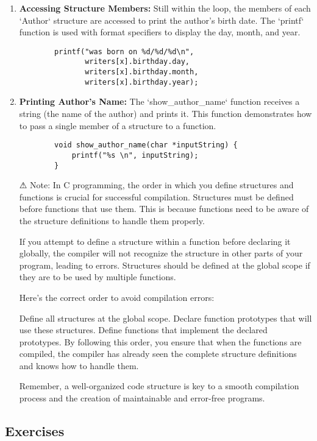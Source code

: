 \begin{enumerate}
        \item \textbf{Accessing Structure Members:} Still within the loop, the members of each `Author` structure are accessed to print the author's birth date. The `printf` function is used with format specifiers to display the day, month, and year.
        \begin{verbatim}
        printf("was born on %d/%d/%d\n",
               writers[x].birthday.day,
               writers[x].birthday.month,
               writers[x].birthday.year);
        \end{verbatim}
    
        \item \textbf{Printing Author's Name:} The `show\_author\_name` function receives a string (the name of the author) and prints it. This function demonstrates how to pass a single member of a structure to a function.
        \begin{verbatim}
        void show_author_name(char *inputString) {
            printf("%s \n", inputString);
        }
        \end{verbatim}
    \end{enumerate}

\begin{itemize} 
\item[⚠] Note: In C programming, the order in which you define structures and functions is crucial for successful compilation. Structures must be defined before functions that use them. This is because functions need to be aware of the structure definitions to handle them properly.

    If you attempt to define a structure within a function before declaring it globally, the compiler will not recognize the structure in other parts of your program, leading to errors. Structures should be defined at the global scope if they are to be used by multiple functions.
    
    Here’s the correct order to avoid compilation errors:
    
    Define all structures at the global scope.
    Declare function prototypes that will use these structures.
    Define functions that implement the declared prototypes.
    By following this order, you ensure that when the functions are compiled, the compiler has already seen the complete structure definitions and knows how to handle them.
    
    Remember, a well-organized code structure is key to a smooth compilation process and the creation of maintainable and error-free programs.
\end{itemize} 
    
    
\subsection{Exercises}

